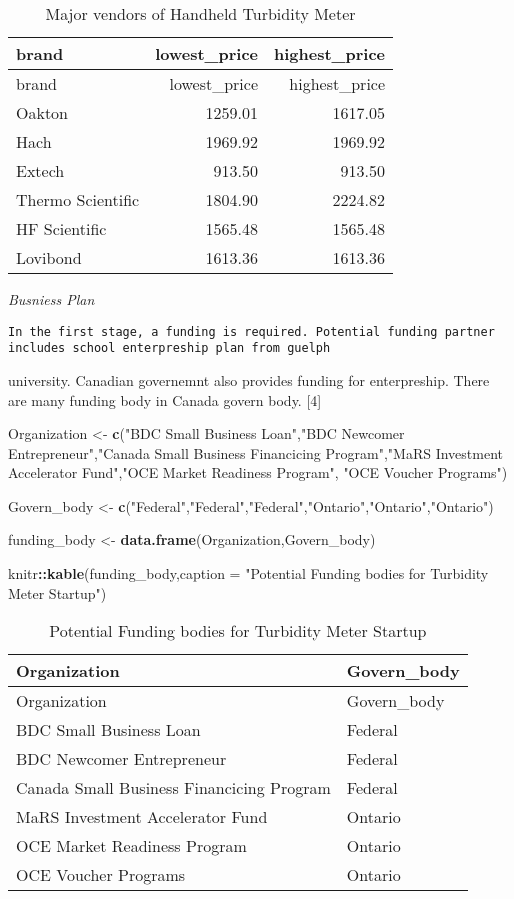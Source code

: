 \documentclass[]{article}
\newenvironment{Shaded}{\begin{snugshade}}{\end{snugshade}}
\newcommand{\KeywordTok}[1]{\textcolor[rgb]{0.13,0.29,0.53}{\textbf{#1}}}
\newcommand{\DataTypeTok}[1]{\textcolor[rgb]{0.13,0.29,0.53}{#1}}
\newcommand{\StringTok}[1]{\textcolor[rgb]{0.31,0.60,0.02}{#1}}
\newcommand{\OperatorTok}[1]{\textcolor[rgb]{0.81,0.36,0.00}{\textbf{#1}}}
\newcommand{\NormalTok}[1]{#1}
\begin{document}
\begin{longtable}[]{@{}lrr@{}}
\caption{Major vendors of Handheld Turbidity Meter}\tabularnewline
\toprule
brand & lowest\_price & highest\_price\tabularnewline
\midrule
\endfirsthead
\toprule
brand & lowest\_price & highest\_price\tabularnewline
\midrule
\endhead
Oakton & 1259.01 & 1617.05\tabularnewline
Hach & 1969.92 & 1969.92\tabularnewline
Extech & 913.50 & 913.50\tabularnewline
Thermo Scientific & 1804.90 & 2224.82\tabularnewline
HF Scientific & 1565.48 & 1565.48\tabularnewline
Lovibond & 1613.36 & 1613.36\tabularnewline
\bottomrule
\end{longtable}

\emph{Busniess Plan}

\begin{verbatim}
In the first stage, a funding is required. Potential funding partner includes school enterpreship plan from guelph
\end{verbatim}

university. Canadian governemnt also provides funding for enterpreship.
There are many funding body in Canada govern body. {[}4{]}

\begin{Shaded}
\begin{Highlighting}[]
\NormalTok{Organization <-}\StringTok{ }\KeywordTok{c}\NormalTok{(}\StringTok{"BDC Small Business Loan"}\NormalTok{,}\StringTok{"BDC Newcomer Entrepreneur"}\NormalTok{,}\StringTok{"Canada Small Business Financicing Program"}\NormalTok{,}\StringTok{"MaRS Investment Accelerator Fund"}\NormalTok{,}\StringTok{"OCE Market Readiness Program"}\NormalTok{, }\StringTok{"OCE Voucher Programs"}\NormalTok{)}

\NormalTok{Govern_body <-}\StringTok{ }\KeywordTok{c}\NormalTok{(}\StringTok{"Federal"}\NormalTok{,}\StringTok{"Federal"}\NormalTok{,}\StringTok{"Federal"}\NormalTok{,}\StringTok{"Ontario"}\NormalTok{,}\StringTok{"Ontario"}\NormalTok{,}\StringTok{"Ontario"}\NormalTok{)}

\NormalTok{funding_body <-}\StringTok{ }\KeywordTok{data.frame}\NormalTok{(Organization,Govern_body)}

\NormalTok{knitr}\OperatorTok{::}\KeywordTok{kable}\NormalTok{(funding_body,}\DataTypeTok{caption =} \StringTok{"Potential Funding bodies for Turbidity Meter Startup"}\NormalTok{)}
\end{Highlighting}
\end{Shaded}

\begin{longtable}[]{@{}ll@{}}
\caption{Potential Funding bodies for Turbidity Meter
Startup}\tabularnewline
\toprule
Organization & Govern\_body\tabularnewline
\midrule
\endfirsthead
\toprule
Organization & Govern\_body\tabularnewline
\midrule
\endhead
BDC Small Business Loan & Federal\tabularnewline
BDC Newcomer Entrepreneur & Federal\tabularnewline
Canada Small Business Financicing Program & Federal\tabularnewline
MaRS Investment Accelerator Fund & Ontario\tabularnewline
OCE Market Readiness Program & Ontario\tabularnewline
OCE Voucher Programs & Ontario\tabularnewline
\bottomrule
\end{longtable}
\end{document}
